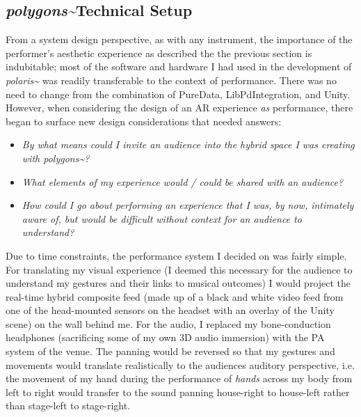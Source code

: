 \subsection{\textit{polygons\textasciitilde{}}Technical Setup}\label{sec: polygons-performances-setup}
From a system design perspective, as with any instrument, the importance of the performer's aesthetic experience as described the the previous section is indubitable; most of the software and hardware I had used in the development of \textit{polaris\textasciitilde{}} was readily transferable to the context of performance. There was no need to change from the combination of PureData, LibPdIntegration, and Unity. However, when considering the design of an AR experience \textit{as} performance, there began to surface new design considerations that needed answers:
\begin{itemize}
    \item \textit{By what means could I invite an audience into the hybrid space I was creating with \textit{polygons\textasciitilde{}}?} 
    \item \textit{What elements of my experience would / could be shared with an audience?} 
    \item \textit{How could I go about performing an experience that I was, by now, intimately aware of, but would be difficult without context for an audience to understand?} 
\end{itemize}
Due to time constraints, the performance system I decided on was fairly simple. For translating my visual experience (I deemed this necessary for the audience to understand my gestures and their links to musical outcomes) I would project the real-time hybrid composite feed (made up of a black and white video feed from one of the head-mounted sensors on the headset with an overlay of the Unity scene) on the wall behind me. For the audio, I replaced my bone-conduction headphones (sacrificing some of my own 3D audio immersion) with the PA system of the venue. The panning would be reversed so that my gestures and movements would translate realistically to the audiences auditory perspective, i.e. the movement of my hand during the performance of \textit{hands} across my body from left to right would transfer to the sound panning house-right to house-left rather than stage-left to stage-right.

